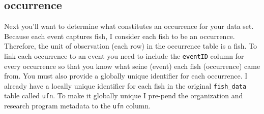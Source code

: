 \documentclass[]{book}
\begin{document}
\hypertarget{occurrence}{%
\subsection{occurrence}\label{occurrence}}

Next you'll want to determine what constitutes an occurrence for your data set. Because each event captures fish, I consider each fish to be an occurrence. Therefore, the unit of observation (each row) in the occurrence table is a fish. To link each occurrence to an event you need to include the \texttt{eventID} column for every occurrence so that you know what seine (event) each fish (occurrence) came from. You must also provide a globally unique identifier for each occurrence. I already have a locally unique identifier for each fish in the original \texttt{fish\_data} table called \texttt{ufn}. To make it globally unique I pre-pend the organization and research program metadata to the \texttt{ufn} column.
\end{document}
